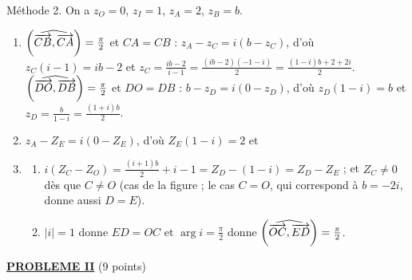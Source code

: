 \begin{description}
\begin{enumerate}
\begin{enumerate}
				\par\noindent{}
		\end{enumerate}
	\end{enumerate}
	\item[PARTIE II :] Méthode 2. On a $z_O = 0$, $z_I = 1$, $z_A = 2$, $z_B = b$.
	\begin{enumerate}
		\item {}
			$\left( \widehat{ \overrightarrow{CB} , \overrightarrow{CA} } \right) = \frac{\pi}{2}$ et $CA = CB$ : $z_A - z_C = i(b - z_C)$, d'où $z_C(i - 1) = ib - 2$ et
			$z_C = \frac{ib - 2}{i - 1} = \frac{(ib - 2)(-1 - i)}{2} = \frac{(1 - i)b + 2 + 2i}{2}$.
			$\left( \widehat{ \overrightarrow{DO} , \overrightarrow{DB} } \right) = \frac{\pi}{2}$ et $DO = DB$ : $b - z_D = i(0 - z_D)$, d'où $z_D(1 - i) = b$ et $z_D = \frac{b}{1 - i} = \frac{(1+i)b}{2}$.
			\par\noindent{}
		\item {}
			$z_A - Z_E = i(0 - Z_E)$, d'où $Z_E(1 - i) = 2$ et \par\noindent{}
		\item
		\begin{enumerate}
			\item {}
				$i(Z_C - Z_O) = \frac{(i + 1)b}{2} + i - 1 = Z_D - (1 - i) = Z_D - Z_E$ ; et $Z_C \neq 0$ dès que $C \neq O$ (cas de la figure ; le cas $C = O$, qui correspond à $b = -2i$, donne aussi $D = E$).
				\par\noindent{}
			\item {}
				$|i| = 1$ donne $ED = OC$ et $\arg i = \frac{\pi}{2}$ donne $\left( \widehat{ \overrightarrow{OC} , \overrightarrow{ED} } \right) = \frac{\pi}{2}$.
				\par\noindent{}
		\end{enumerate}
	\end{enumerate}
\end{description}
\noindent \underline{\textsc{\textbf{PROBLEME II}}} (9 points)
